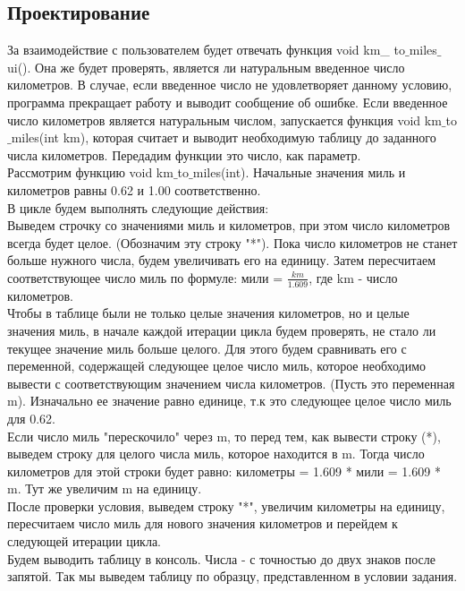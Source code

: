 \documentclass[12pt,a4paper]{report}
\begin{document}
\subsection{Проектирование}
За взаимодействие с пользователем будет отвечать функция void km\_ to$\_$miles$\_$ui(). Она же будет проверять, является ли натуральным введенное число километров. В случае, если введенное число не удовлетворяет данному условию, программа прекращает работу и выводит сообщение об ошибке. Если введенное число километров является натуральным числом, запускается функция void km$\_$to$\_$miles(int km), которая считает и выводит необходимую таблицу до заданного числа километров. Передадим функции это число, как параметр. \\
Рассмотрим функцию void km$\_$to$\_$miles(int). Начальные значения миль и километров равны 0.62 и 1.00 соответственно. \\
В цикле будем выполнять следующие действия: \\
Выведем строчку со значениями миль и километров, при этом число километров всегда будет целое. (Обозначим эту строку "*"). Пока число километров не станет больше нужного числа, будем увеличивать его на единицу. Затем пересчитаем соответствующее число миль по формуле: мили = $\frac{km}{1.609}$, где km - число километров. \\
Чтобы в таблице были не только целые значения километров, но и целые значения миль, в начале каждой итерации цикла будем проверять, не стало ли текущее значение миль больше целого. Для этого будем сравнивать его с переменной, содержащей следующее целое число миль, которое необходимо вывести с соответствующим значением числа километров. (Пусть это переменная m). Изначально ее значение равно единице, т.к это следующее целое число миль для 0.62. \\
Если число миль "перескочило" через m, то перед тем, как вывести строку (*), выведем строку для целого числа миль, которое находится в m. Тогда число километров для этой строки будет равно: километры = 1.609 * мили = 1.609 * m. Тут же увеличим m на единицу. \\
После проверки условия, выведем строку "*", увеличим километры на единицу, пересчитаем число миль для нового значения километров и перейдем к следующей итерации цикла.  \\
Будем выводить таблицу в консоль. Числа - с точностью до двух знаков после запятой. Так мы выведем таблицу по образцу, представленном в условии задания. 
\end{document}
